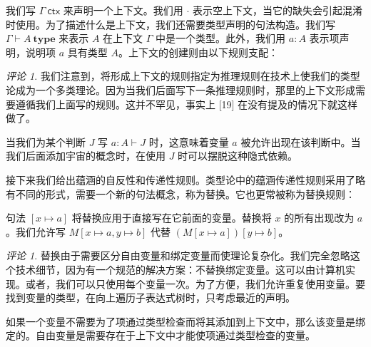 \documentclass{ctexrep}
\theoremstyle{plain}
\theoremstyle{definition}
\theoremstyle{remark}
\newtheorem{remark}[theorem]{评论}
\theoremstyle{definition}
\theoremstyle{definition}
\theoremstyle{definition}
\newcommand{\Type}{\textbf{type}}
\begin{document}
我们写 $\Gamma\ \textsf{ctx}$ 来声明一个上下文。我们用 $\cdot$ 表示空上下文，当它的缺失会引起混淆时使用。为了描述什么是上下文，我们还需要类型声明的句法构造。我们写 $\Gamma \vdash A\ \Type$ 来表示 $A$ 在上下文 $\Gamma$ 中是一个类型。此外，我们用 $a:A$ 表示项声明，说明项 $a$ 具有类型 $A$。上下文的创建则由以下规则支配：

\begin{remark}
我们注意到，将形成上下文的规则指定为推理规则在技术上使我们的类型论成为一个多类理论。因为当我们后面写下一条推理规则时，那里的上下文形成需要遵循我们上面写的规则。这并不罕见，事实上 [19] 在没有提及的情况下就这样做了。
\end{remark}

当我们为某个判断 $J$ 写 $a:A\vdash J$ 时，这意味着变量 $a$ 被允许出现在该判断中。当我们后面添加宇宙的概念时，在使用 $J$ 时可以摆脱这种隐式依赖。

接下来我们给出蕴涵的自反性和传递性规则。类型论中的蕴涵传递性规则采用了略有不同的形式，需要一个新的句法概念，称为替换。它也更常被称为替换规则：
句法 $[x\mapsto a]$ 将替换应用于直接写在它前面的变量。替换将 $x$ 的所有出现改为 $a$。我们允许写 $M[x\mapsto a,y\mapsto b]$ 代替 $(M[x\mapsto a])[y\mapsto b]$。

\begin{remark}
替换由于需要区分自由变量和绑定变量而使理论复杂化。我们完全忽略这个技术细节，因为有一个规范的解决方案：不替换绑定变量。这可以由计算机实现。或者，我们可以只使用每个变量一次。为了方便，我们允许重复使用变量。要找到变量的类型，在向上遍历子表达式树时，只考虑最近的声明。
\end{remark}

如果一个变量不需要为了项通过类型检查而将其添加到上下文中，那么该变量是绑定的。自由变量是需要存在于上下文中才能使项通过类型检查的变量。
\end{document}

